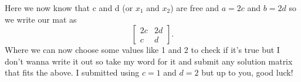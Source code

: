 \documentclass{report}
\begin{document}
Here we now know that c and d (or $ x_1 $ and $ x_2 $) are free and $ a= 2c $ and $ b=2d $ so we write our mat as
\[
	\begin{bmatrix} 2c & 2d \\ c & d \end{bmatrix} 
.\] 
Where we can now choose some values like 1 and 2 to check if it's true but I don't wanna write it out so take my word for it and submit any solution matrix that fits the above. I submitted using $ c=1 $ and $ d=2 $ but up to you, good luck!
\end{document}
